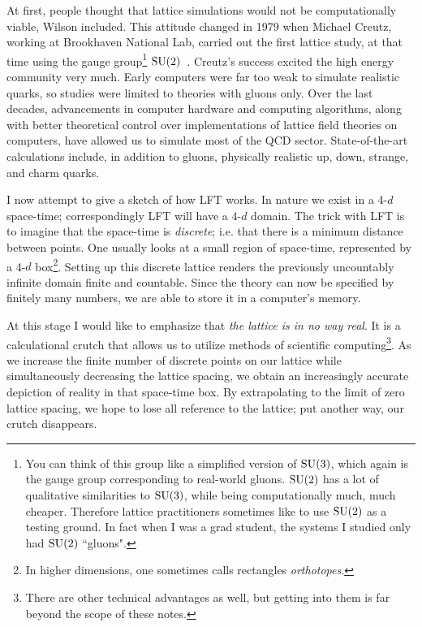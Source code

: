 At first, people thought that lattice simulations would not be computationally
viable, Wilson included. This attitude changed in 1979 when Michael Creutz, 
working at Brookhaven
National Lab, carried out the first lattice study, at that time using the gauge
group\footnote{You can think of this group like a simplified version of
$\operatorname{SU}(3)$, which again is the gauge group corresponding to real-world gluons.
$\operatorname{SU}(2)$ has a lot of qualitative similarities to $\operatorname{SU}(3)$, while being
computationally much, much cheaper. Therefore lattice practitioners sometimes
like to use $\operatorname{SU}(2)$ as a testing ground. In fact when I was a grad student, the
systems I studied only had $\operatorname{SU}(2)$ ``gluons".} $\operatorname{SU}(2)$~\cite{creutz_monte_1980}. 
Creutz's success excited the high
energy community very much. Early computers were far too weak to simulate realistic
quarks, so studies were limited to theories with gluons only. Over the last
decades, advancements in computer hardware and computing algorithms, along with 
better theoretical control over implementations of lattice field theories on
computers, have allowed us to simulate most of the QCD sector. State-of-the-art 
calculations include, in addition to gluons, physically realistic up, down,
strange, and charm quarks.

I now attempt to give a sketch of how LFT works. In nature we
exist in a 4-$d$ space-time; correspondingly LFT will have a 4-$d$ domain. The
trick with LFT is to imagine that the space-time is {\it
discrete}; i.e. that there is a minimum distance between points.
One usually looks at a small region of space-time, represented by a 4-$d$
box\footnote{In higher dimensions, one sometimes calls rectangles
{\it orthotopes}.}. Setting up this discrete lattice renders
the previously uncountably infinite domain finite and countable. Since the
theory can now be specified by finitely many numbers, we are able to store it in
a computer's memory.

At this stage I would like to emphasize that {\it the lattice is in no way
real}. It is a calculational crutch that allows us to utilize methods of scientific
computing\footnote{There are other technical advantages as well, but getting
into them is far beyond the scope of these notes.}. As we increase the finite
number of discrete points on our lattice while simultaneously decreasing the
lattice spacing, we obtain an increasingly accurate depiction of reality in that
space-time box. By extrapolating to the limit of zero lattice spacing, we hope
to lose all reference to the lattice; put another way, our crutch disappears.

